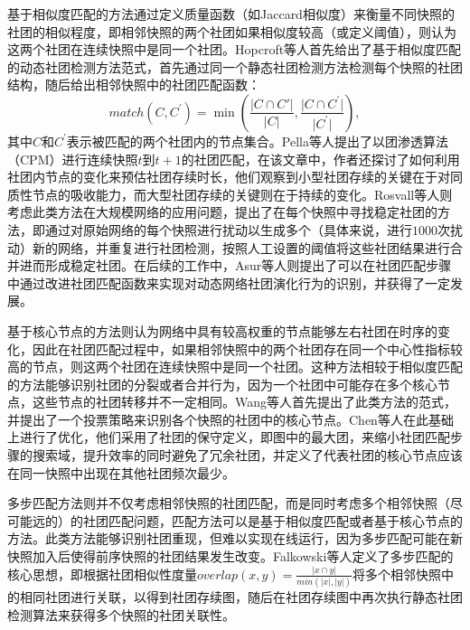 基于相似度匹配的方法通过定义质量函数（如Jaccard相似度）来衡量不同快照的社团的相似程度，即相邻快照的两个社团如果相似度较高（或定义阈值），则认为这两个社团在连续快照中是同一个社团。Hopcroft等人\cite{hopcroft2004tracking}首先给出了基于相似度匹配的动态社团检测方法范式，首先通过同一个静态社团检测方法检测每个快照的社团结构，随后给出相邻快照中的社团匹配函数：
\begin{equation}
    match(C,C^{'})=\min(\frac{\lvert C \cap C{'} \rvert}{\lvert C \rvert},\frac{\lvert C \cap C^{'} \rvert}{\lvert C^{'} \rvert}),
\end{equation}
其中$C$和$C^{'}$表示被匹配的两个社团内的节点集合。Pella等人\cite{palla2007quantifying}提出了以团渗透算法（CPM）进行连续快照$t$到$t+1$的社团匹配，在该文章中，作者还探讨了如何利用社团内节点的变化来预估社团存续时长，他们观察到小型社团存续的关键在于对同质性节点的吸收能力，而大型社团存续的关键则在于持续的变化。Rosvall等人\cite{rosvall2010mapping}则考虑此类方法在大规模网络的应用问题，提出了在每个快照中寻找稳定社团的方法，即通过对原始网络的每个快照进行扰动以生成多个（具体来说，进行$1000$次扰动）新的网络，并重复进行社团检测，按照人工设置的阈值将这些社团结果进行合并进而形成稳定社团。在后续的工作中，Asur等人\cite{asur2009event}则提出了可以在社团匹配步骤中通过改进社团匹配函数来实现对动态网络社团演化行为的识别，并获得了一定发展\cite{bota2011dynamic}。

基于核心节点的方法则认为网络中具有较高权重的节点能够左右社团在时序的变化，因此在社团匹配过程中，如果相邻快照中的两个社团存在同一个中心性指标较高的节点，则这两个社团在连续快照中是同一个社团。这种方法相较于相似度匹配的方法能够识别社团的分裂或者合并行为，因为一个社团中可能存在多个核心节点，这些节点的社团转移并不一定相同。Wang等人\cite{wang2008commtracker}首先提出了此类方法的范式，并提出了一个投票策略来识别各个快照的社团中的核心节点。Chen等人\cite{chen2010detecting}在此基础上进行了优化，他们采用了社团的保守定义，即图中的最大团，来缩小社团匹配步骤的搜索域，提升效率的同时避免了冗余社团，并定义了代表社团的核心节点应该在同一快照中出现在其他社团频次最少。

多步匹配方法则并不仅考虑相邻快照的社团匹配，而是同时考虑多个相邻快照（尽可能远的）的社团匹配问题，匹配方法可以是基于相似度匹配或者基于核心节点的方法。此类方法能够识别社团重现，但难以实现在线运行，因为多步匹配可能在新快照加入后使得前序快照的社团结果发生改变。Falkowski等人\cite{falkowski2006mining,falkowski2007data}定义了多步匹配的核心思想，即根据社团相似性度量$overlap(x,y)=\frac{\lvert x \cap y \rvert}{min(\lvert x \rvert,\lvert y \rvert)}$将多个相邻快照中的相同社团进行关联，以得到社团存续图，随后在社团存续图中再次执行静态社团检测算法来获得多个快照的社团关联性。

